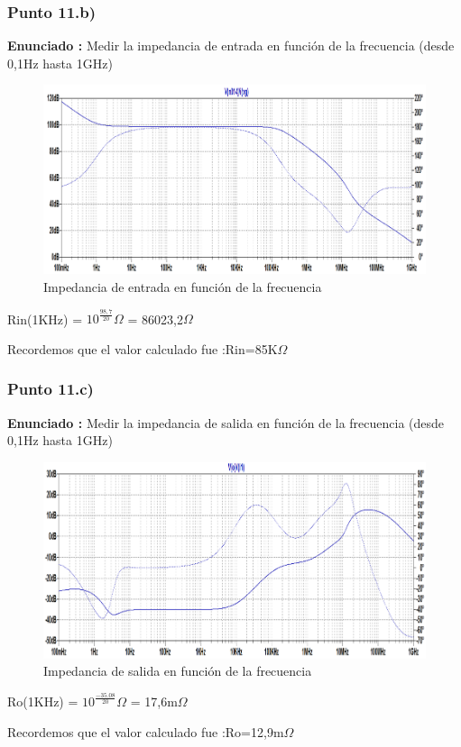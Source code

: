 \documentclass[12pt]{book}
\begin{document}
\subsubsection{Punto 11.b)}
\textbf{Enunciado : } Medir la impedancia de entrada en función de la frecuencia (desde 0,1Hz hasta 1GHz)\\[1cm]
\begin{figure}[H]
\centering
\includegraphics[scale=0.4]{figuras/11-b-Zin.png}
\caption{Impedancia de entrada en función de la frecuencia}
\label{figura11b}
\end{figure}
\begin{center}
Rin(1KHz) = $10^\frac{98,7}{20}\Omega$ = 86023,2$\Omega$
\end{center}
Recordemos que el valor calculado fue :\quad Rin=85K$\Omega$

\subsubsection{Punto 11.c)}
\textbf{Enunciado : } Medir la impedancia de salida en función de la frecuencia (desde 0,1Hz hasta 1GHz)\\[1cm]
\begin{figure}[H]
\centering
\includegraphics[scale=0.4]{figuras/11-c-Zout.png}
\caption{Impedancia de salida en función de la frecuencia}
\label{figura11c}
\end{figure}
\begin{center}
Ro(1KHz) = $10^\frac{-35.08}{20}\Omega$ = 17,6m$\Omega$
\end{center}
Recordemos que el valor calculado fue :\quad Ro=12,9m$\Omega$
\end{document}
